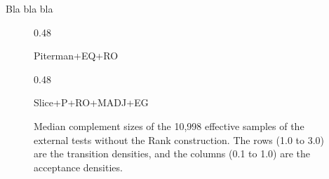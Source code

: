 Bla bla bla


\renewcommand{\arraystretch}{1.4}
\renewcommand{\subwidth}{0.48}



\begin{figure}[h]
  \centering
  \begin{scriptsize}
  \renewcommand{\tabcolsep}{0.05cm}
  \begin{subtable}[t]{\subwidth\textwidth}
    \centering
    
    \caption{Piterman+EQ+RO}
  \end{subtable}
  \hfill
  \begin{subtable}[t]{\subwidth\textwidth}
    \centering
    
    \caption{Slice+P+RO+MADJ+EG}
  \end{subtable}
\end{scriptsize}
\caption{Median complement sizes of the 10,998 effective samples of the external tests without the Rank construction. The rows (1.0 to 3.0) are the transition densities, and the columns (0.1 to 1.0) are the acceptance densities.}
\end{figure}

